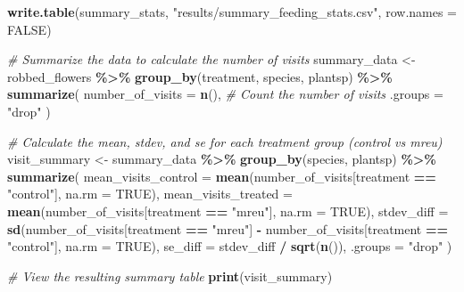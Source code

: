 \documentclass[
]{article}
\newenvironment{Shaded}{\begin{snugshade}}{\end{snugshade}}
\newcommand{\AttributeTok}[1]{\textcolor[rgb]{0.13,0.29,0.53}{#1}}
\newcommand{\CommentTok}[1]{\textcolor[rgb]{0.56,0.35,0.01}{\textit{#1}}}
\newcommand{\ConstantTok}[1]{\textcolor[rgb]{0.56,0.35,0.01}{#1}}
\newcommand{\FunctionTok}[1]{\textcolor[rgb]{0.13,0.29,0.53}{\textbf{#1}}}
\newcommand{\NormalTok}[1]{#1}
\newcommand{\OtherTok}[1]{\textcolor[rgb]{0.56,0.35,0.01}{#1}}
\newcommand{\SpecialCharTok}[1]{\textcolor[rgb]{0.81,0.36,0.00}{\textbf{#1}}}
\newcommand{\StringTok}[1]{\textcolor[rgb]{0.31,0.60,0.02}{#1}}
\begin{document}
\begin{Shaded}
\begin{Highlighting}[]
\FunctionTok{write.table}\NormalTok{(summary\_stats, }\StringTok{"results/summary\_feeding\_stats.csv"}\NormalTok{, }\AttributeTok{row.names =} \ConstantTok{FALSE}\NormalTok{)}
\end{Highlighting}
\end{Shaded}

\begin{Shaded}
\begin{Highlighting}[]
\CommentTok{\# Summarize the data to calculate the number of visits}
\NormalTok{summary\_data }\OtherTok{\textless{}{-}}\NormalTok{ robbed\_flowers }\SpecialCharTok{\%\textgreater{}\%}
  \FunctionTok{group\_by}\NormalTok{(treatment, species, plantsp) }\SpecialCharTok{\%\textgreater{}\%}
  \FunctionTok{summarize}\NormalTok{(}
    \AttributeTok{number\_of\_visits =} \FunctionTok{n}\NormalTok{(),  }\CommentTok{\# Count the number of visits}
    \AttributeTok{.groups =} \StringTok{"drop"}
\NormalTok{  )}

\CommentTok{\# Calculate the mean, stdev, and se for each treatment group (control vs mreu)}
\NormalTok{visit\_summary }\OtherTok{\textless{}{-}}\NormalTok{ summary\_data }\SpecialCharTok{\%\textgreater{}\%}
  \FunctionTok{group\_by}\NormalTok{(species, plantsp) }\SpecialCharTok{\%\textgreater{}\%}
  \FunctionTok{summarize}\NormalTok{(}
    \AttributeTok{mean\_visits\_control =} \FunctionTok{mean}\NormalTok{(number\_of\_visits[treatment }\SpecialCharTok{==} \StringTok{"control"}\NormalTok{], }\AttributeTok{na.rm =} \ConstantTok{TRUE}\NormalTok{),}
    \AttributeTok{mean\_visits\_treated =} \FunctionTok{mean}\NormalTok{(number\_of\_visits[treatment }\SpecialCharTok{==} \StringTok{"mreu"}\NormalTok{], }\AttributeTok{na.rm =} \ConstantTok{TRUE}\NormalTok{),}
    \AttributeTok{stdev\_diff =} \FunctionTok{sd}\NormalTok{(number\_of\_visits[treatment }\SpecialCharTok{==} \StringTok{"mreu"}\NormalTok{] }\SpecialCharTok{{-}}\NormalTok{ number\_of\_visits[treatment }\SpecialCharTok{==} \StringTok{"control"}\NormalTok{], }\AttributeTok{na.rm =} \ConstantTok{TRUE}\NormalTok{),}
    \AttributeTok{se\_diff =}\NormalTok{ stdev\_diff }\SpecialCharTok{/} \FunctionTok{sqrt}\NormalTok{(}\FunctionTok{n}\NormalTok{()),}
    \AttributeTok{.groups =} \StringTok{"drop"}
\NormalTok{  )}

\CommentTok{\# View the resulting summary table}
\FunctionTok{print}\NormalTok{(visit\_summary)}
\end{Highlighting}
\end{Shaded}
\end{document}
